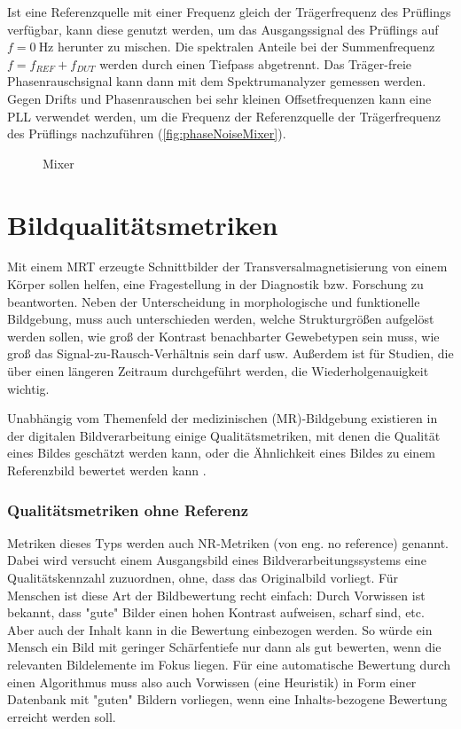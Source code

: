 Ist eine Referenzquelle mit einer Frequenz gleich der Trägerfrequenz des Prüflings verfügbar, kann diese genutzt werden, um das Ausgangssignal des Prüflings auf $f=\SI{0}{\hertz}$ herunter zu mischen. Die spektralen Anteile bei der Summenfrequenz $f=f_{REF}+f_{DUT}$ werden durch einen Tiefpass abgetrennt. Das Träger-freie Phasenrauschsignal kann dann mit dem Spektrumanalyzer gemessen werden.
Gegen Drifts und Phasenrauschen bei sehr kleinen Offsetfrequenzen kann eine PLL verwendet werden, um die Frequenz der Referenzquelle der Trägerfrequenz des Prüflings nachzuführen (\autoref{fig:phaseNoiseMixer}).

\begin{figure}[H]
	\centering
	\caption[ph]{Mixer}
	\label{fig:phaseNoiseMixer}
\end{figure}



\section{Bildqualitätsmetriken}
Mit einem MRT erzeugte Schnittbilder der Transversalmagnetisierung von einem Körper sollen helfen, eine Fragestellung in der Diagnostik bzw. Forschung zu beantworten. Neben der Unterscheidung in morphologische und funktionelle Bildgebung, muss auch unterschieden werden, welche Strukturgrößen aufgelöst werden sollen, wie groß der Kontrast benachbarter Gewebetypen sein muss, wie groß das Signal-zu-Rausch-Verhältnis sein darf usw. Außerdem ist für Studien, die über einen längeren Zeitraum durchgeführt werden, die Wiederholgenauigkeit wichtig.

Unabhängig vom Themenfeld der medizinischen (MR)-Bildgebung existieren in der digitalen Bildverarbeitung einige Qualitätsmetriken, mit denen die Qualität eines Bildes geschätzt werden kann, oder die Ähnlichkeit eines Bildes zu einem Referenzbild bewertet werden kann \cite{Wang2006}.

\subsubsection{Qualitätsmetriken ohne Referenz}
Metriken dieses Typs werden auch NR-Metriken (von eng. no reference) genannt. Dabei wird versucht einem Ausgangsbild eines Bildverarbeitungssystems eine Qualitätskennzahl zuzuordnen, ohne, dass das Originalbild vorliegt. Für Menschen ist diese Art der Bildbewertung recht einfach: Durch Vorwissen ist bekannt, dass "gute" Bilder einen hohen Kontrast aufweisen, scharf sind, etc. Aber auch der Inhalt kann in die Bewertung einbezogen werden. So würde ein Mensch ein Bild mit geringer Schärfentiefe nur dann als gut bewerten, wenn die relevanten Bildelemente im Fokus liegen. Für eine automatische Bewertung durch einen Algorithmus muss also auch Vorwissen (eine Heuristik) in Form einer Datenbank mit "guten" Bildern vorliegen, wenn eine Inhalts-bezogene Bewertung erreicht werden soll.

